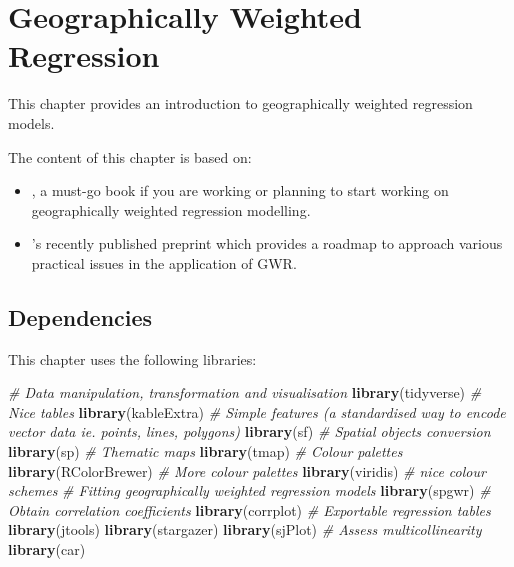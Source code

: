 \documentclass[
]{book}
\newenvironment{Shaded}{\begin{snugshade}}{\end{snugshade}}
\newcommand{\CommentTok}[1]{\textcolor[rgb]{0.56,0.35,0.01}{\textit{#1}}}
\newcommand{\KeywordTok}[1]{\textcolor[rgb]{0.13,0.29,0.53}{\textbf{#1}}}
\newcommand{\NormalTok}[1]{#1}
\begin{document}
\hypertarget{gwr}{%
\chapter{Geographically Weighted Regression}\label{gwr}}

This chapter provides an introduction to geographically weighted regression models.

The content of this chapter is based on:

\begin{itemize}
\item
  \citet{Fotheringham_et_al_2002_book}, a must-go book if you are working or planning to start working on geographically weighted regression modelling.
\item
  \citet{comber2020gwr}'s recently published preprint which provides a roadmap to approach various practical issues in the application of GWR.
\end{itemize}

\hypertarget{dependencies-6}{%
\section{Dependencies}\label{dependencies-6}}

This chapter uses the following libraries:

\begin{Shaded}
\begin{Highlighting}[]
\CommentTok{# Data manipulation, transformation and visualisation}
\KeywordTok{library}\NormalTok{(tidyverse)}
\CommentTok{# Nice tables}
\KeywordTok{library}\NormalTok{(kableExtra)}
\CommentTok{# Simple features (a standardised way to encode vector data ie. points, lines, polygons)}
\KeywordTok{library}\NormalTok{(sf) }
\CommentTok{# Spatial objects conversion}
\KeywordTok{library}\NormalTok{(sp) }
\CommentTok{# Thematic maps}
\KeywordTok{library}\NormalTok{(tmap) }
\CommentTok{# Colour palettes}
\KeywordTok{library}\NormalTok{(RColorBrewer) }
\CommentTok{# More colour palettes}
\KeywordTok{library}\NormalTok{(viridis) }\CommentTok{# nice colour schemes}
\CommentTok{# Fitting geographically weighted regression models}
\KeywordTok{library}\NormalTok{(spgwr)}
\CommentTok{# Obtain correlation coefficients}
\KeywordTok{library}\NormalTok{(corrplot)}
\CommentTok{# Exportable regression tables}
\KeywordTok{library}\NormalTok{(jtools)}
\KeywordTok{library}\NormalTok{(stargazer)}
\KeywordTok{library}\NormalTok{(sjPlot)}
\CommentTok{# Assess multicollinearity}
\KeywordTok{library}\NormalTok{(car)}
\end{Highlighting}
\end{Shaded}
\end{document}
